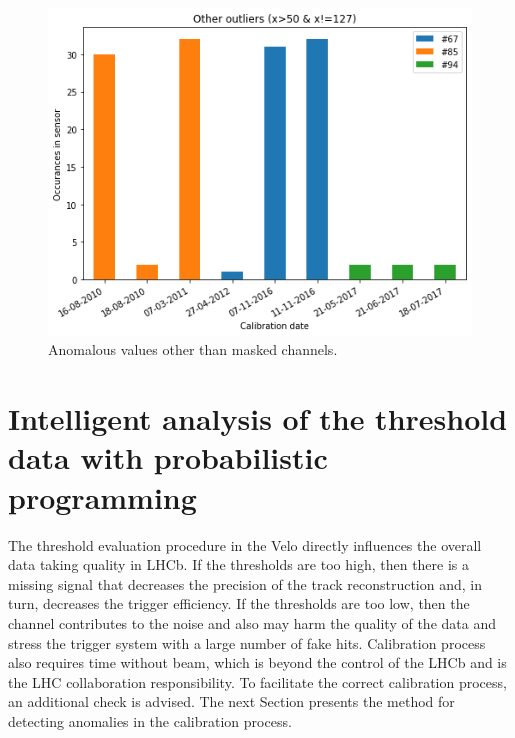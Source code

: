 \begin{figure}
    \centering
    \includegraphics[width=0.7\linewidth]{figures/chapter4/calib_analysis/P3-other-outliers.png}
    \caption{Anomalous values other than masked channels.}
    \label{plot:p3-other-outliers}
  \end{figure}





\section{Intelligent analysis of the threshold data with probabilistic programming}
\label{chap4:outlierness}
The threshold evaluation procedure in the Velo directly influences the overall data taking quality in LHCb.
If the thresholds are too high, then there is a missing signal that decreases the precision of the track reconstruction and, in turn, decreases the trigger efficiency.
If the thresholds are too low, then the channel contributes to the noise and also may harm the quality of the data and stress the trigger system with a large number of fake hits.
Calibration process also requires time without beam, which is beyond the control of the LHCb and is the LHC collaboration responsibility.
To facilitate the correct calibration process, an additional check is advised.
The next Section presents the method for detecting anomalies in the calibration process.

